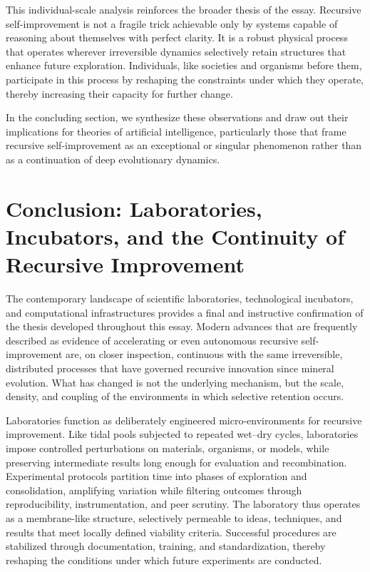\documentclass[11pt]{article}
\begin{document}
This individual-scale analysis reinforces the broader thesis of the essay. Recursive self-improvement is not a fragile trick achievable only by systems capable of reasoning about themselves with perfect clarity. It is a robust physical process that operates wherever irreversible dynamics selectively retain structures that enhance future exploration. Individuals, like societies and organisms before them, participate in this process by reshaping the constraints under which they operate, thereby increasing their capacity for further change.

In the concluding section, we synthesize these observations and draw out their implications for theories of artificial intelligence, particularly those that frame recursive self-improvement as an exceptional or singular phenomenon rather than as a continuation of deep evolutionary dynamics.

\section{Conclusion: Laboratories, Incubators, and the Continuity of Recursive Improvement}

The contemporary landscape of scientific laboratories, technological incubators, and computational infrastructures provides a final and instructive confirmation of the thesis developed throughout this essay. Modern advances that are frequently described as evidence of accelerating or even autonomous recursive self-improvement are, on closer inspection, continuous with the same irreversible, distributed processes that have governed recursive innovation since mineral evolution. What has changed is not the underlying mechanism, but the scale, density, and coupling of the environments in which selective retention occurs.

Laboratories function as deliberately engineered micro-environments for recursive improvement. Like tidal pools subjected to repeated wet--dry cycles, laboratories impose controlled perturbations on materials, organisms, or models, while preserving intermediate results long enough for evaluation and recombination. Experimental protocols partition time into phases of exploration and consolidation, amplifying variation while filtering outcomes through reproducibility, instrumentation, and peer scrutiny. The laboratory thus operates as a membrane-like structure, selectively permeable to ideas, techniques, and results that meet locally defined viability criteria. Successful procedures are stabilized through documentation, training, and standardization, thereby reshaping the conditions under which future experiments are conducted.
\end{document}

